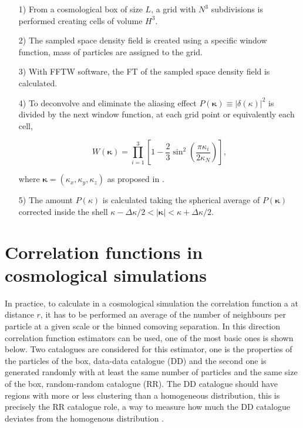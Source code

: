 \begin{enumerate}

\item[1)] From a cosmological box of size $L$, a grid with $N^3$ subdivisions is performed
creating cells of volume $H^3$. 

\item[2)] The sampled space density field is created using a specific window function,
mass of particles are assigned to the grid. 

\item[3)] With FFTW software, the FT of the sampled space density field is calculated.

\item[4)] To deconvolve and eliminate the aliasing effect $P(\boldsymbol{\kappa})\equiv |\delta(\kappa)|^2$ is divided by the next window function, at each grid point or equivalently each cell,

\[ W(\boldsymbol{\kappa}) = \prod^{3}_{i=1}\left[ 1 - \frac{2}{3}\sin^2\left(\frac{\pi\kappa_i}{2\kappa_N}\right) \right] ,\]

where $\boldsymbol{\kappa} = (\kappa_x,\kappa_y,\kappa_z)$ as proposed in \cite{Jeong}.  

\item[5)] The amount $P(\kappa)$ is calculated taking the spherical average of 
$P(\boldsymbol{\kappa})$ corrected inside the shell 
$\kappa -\Delta\kappa/2	< |\boldsymbol{\kappa}|<\kappa +\Delta\kappa/2$.

\end{enumerate}


\section{ Correlation functions in cosmological simulations }
\label{STM}


In practice, to calculate in a cosmological simulation the correlation function 
a at distance $r$, it has to be performed an average of the number of neighbours per 
particle at a given scale or the binned comoving separation. In this direction 
correlation function estimators can be used, one of the most basic ones is shown below. 
Two catalogues are considered for this estimator, one is the properties of the particles 
of the box, data-data catalogue (DD) and the second one is generated 
randomly with at least the same number of particles and the same size of the box, 
random-random catalogue (RR). The DD catalogue should have regions with more or
less clustering than a homogeneous distribution, this is precisely the RR catalogue role, 
a way to measure how much the DD catalogue deviates from the homogenous distribution \cite{CF_theor}. 


